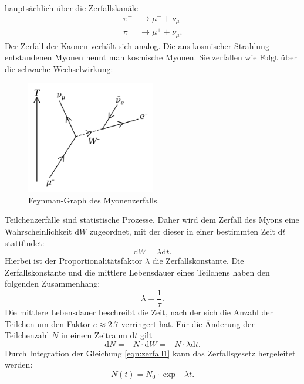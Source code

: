 \noindent
hauptsächlich über die Zerfallskanäle
\begin{align*}
\pi^{-} & \rightarrow \mu^{-} + \bar{\nu}_{\mu} \\
\pi^{+} & \rightarrow \mu^{+} + \nu_{\mu}.
\end{align*}
\noindent
Der Zerfall der Kaonen verhält sich analog. Die aus kosmischer Strahlung entstandenen
Myonen nennt man kosmische Myonen.
Sie zerfallen wie Folgt über die schwache Wechselwirkung:
\begin{figure}
  \centering
  \includegraphics[width=0.5\textwidth]{pictures/Muon_Decay.png}
  \caption{Feynman-Graph des Myonenzerfalls.\cite{Myon-Wikipedia}}
  \label{zerfall}
\end{figure}
\noindent
Teilchenzerfälle sind statistische Prozesse. Daher wird dem Zerfall des Myons
eine Wahrscheinlichkeit $\text{d}W$  zugeordnet, mit der dieser in einer bestimmten Zeit $\text{d}t$
stattfindet:
\begin{equation*}
  \text{d}W = \lambda \text{d}t.
\end{equation*}
\noindent
Hierbei ist der Proportionalitätsfaktor $\lambda$ die Zerfallskonstante.
Die Zerfallskonstante und die mittlere Lebensdauer eines Teilchens haben den folgenden
Zusammenhang:
\begin{equation*}
  \lambda = \frac{1}{\tau}.
\end{equation*}
\noindent
Die mittlere Lebensdauer beschreibt die Zeit, nach der sich die Anzahl der Teilchen um
den Faktor $e \approx 2.7$ verringert hat.
Für die Änderung der Teilchenzahl $N$ in einem Zeitraum $\text{d}t$ gilt
\begin{equation}
  \text{d}N = - N \cdot \text{d}W = - N \cdot \lambda \text{d}t.
  \label{eqn:zerfall1}
\end{equation}
\noindent
Durch Integration der Gleichung \ref{eqn:zerfall1} kann das Zerfallsgesetz hergeleitet werden:
\begin{equation}
  N(t) = N_{0} \cdot \exp{- \lambda t}.
  \label{eqn:zerfallsgesetz}
\end{equation}
\noindent
